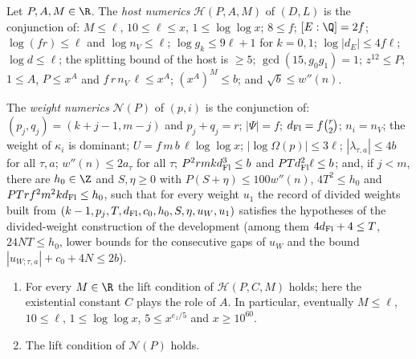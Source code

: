 \begin{definition}\label{pf:lift2:def:num}
Let $P,A,M\in\R$. The \emph{host numerics} $\mathcal H(P,A,M)$ of $(D,L)$ is the conjunction of: $M\le\ell$,
$10\le\ell\le x$, $1\le\log\log x$; $8\le f$; $[E:\Q]=2f$; $\log(fr)\le\ell$ and $\log n_V\le\ell$; $\log g_k\le9\ell+1$
for $k=0,1$; $\log|d_E|\le4f\ell$; $\log d\le\ell$; the splitting bound of the host is $\ge5$; $\gcd(15,g_0g_1)=1$;
$z^{12}\le P$; $1\le A$, $P\le x^A$ and $f\,r\,n_V\,\ell\le x^A$; $(x^A)^M\le b$; and $\sqrt b\le w''(n)$.

The \emph{weight numerics} $\mathcal N(P)$ of $(p,i)$ is the conjunction of: $(p_j,q_j)=(k+j-1,m-j)$ and $p_j+q_j=r$;
$|\Psi|=f$; $d_{\mathrm{Fl}}=f\binom r2$; $n_i=n_V$; the weight of $\kappa_i$ is dominant; $U=f\,m\,b\,\ell\log\log x$;
$|\log\Omega(p)|\le3\ell$; $|\lambda_{\tau,a}|\le4b$ for all $\tau,a$; $w''(n)\le2a_\tau$ for all $\tau$;
$P^2rmkd_{\mathrm{Fl}}^3\le b$ and $PTd_{\mathrm{Fl}}^2\ell\le b$; and, if $j<m$, there are $h_0\in\Z$ and $S,\eta\ge0$ with
$P(S+\eta)\le100w''(n)$, $4T^2\le h_0$ and $PTrf^2m^2kd_{\mathrm{Fl}}\le h_0$, such that for every weight $u_1$ the record of
divided weights built from $(k-1,p_j,T,d_{\mathrm{Fl}},c_0,h_0,S,\eta,u_W,u_1)$ satisfies the hypotheses of the
divided-weight construction of the development (among them $4d_{\mathrm{Fl}}+4\le T$, $24NT\le h_0$, lower bounds for the
consecutive gaps of $u_W$ and the bound $|u_{W;\tau,a}|+c_0+4N\le2b$).
\end{definition}

\begin{proposition}\label{pf:lift2:numholds}
\begin{enumerate}[label=(\alph*)]
\item For every $M\in\R$ the lift condition of $\mathcal H(P,C,M)$ holds; here the existential constant $C$ plays
the role of $A$. In particular, eventually $M\le\ell$, $10\le\ell$, $1\le\log\log x$, $5\le x^{e_z/5}$ and
$x\ge10^{60}$.
\item The lift condition of $\mathcal N(P)$ holds.
\end{enumerate}
\end{proposition}


